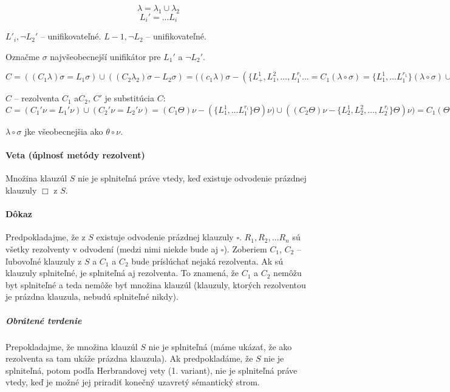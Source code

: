 $$ \lambda = \lambda_1 \cup \lambda_2$$
$$L_i' = \mbox{...} L_i$$

$L'_i, \neg L_2'$ -- unifikovateľné.
$L-1, \neg L_2$ -- unifikovateľné.

Označme $\sigma$ najvšeobecnejší unifikátor pre $L_1'$ a $\neg L_2'$.

$C= ((C_1\lambda)\sigma = L_1\sigma) \cup
((C_2\lambda_2)\sigma-L_2\sigma) = ((c_1\lambda)\sigma - (\{L^1_+, L^2_1,
\ldots, L^{r_i}_1 ...
= C_1(\lambda\circ \sigma) = \{ L^1_1, \ldots L^{r_1}_1 \} (\lambda\circ\sigma)
\cup C_2)(\lambda\circ\sigma) - \{L^1_2, \ldots
L^{r_i}_1\}(\lambda\circ\sigma)$

\par $C$ -- rezolventa $C_1$ a$C_2$, $C'$ je substitúcia $C$:
$C = (C_1' \nu = L_1' \nu) \cup (C_2'\nu = L_2'\nu) = (C_1\Theta)\nu -
(\{L^1_1, \ldots L^{r_i}_1\}\Theta)\nu)\cup ((C_2\Theta)\nu - \{L^1_2, L^2_2,
\ldots, L^{r_i}_2\}\Theta )\nu) = 
C_1(\Theta\circ\nu) - \{L^1_1, \ldots, L^{r_i}_1\} \Theta\circ\nu) \cup
(C_2(\Theta\circ\nu) - \{L^1_2, \ldots L^{r_i}_2\} \Theta\circ\nu)
$

$\lambda \circ \sigma$ jke všeobecnejšia ako $\theta \circ \nu$.


\paragraph{Veta (úplnosť metódy rezolvent)} Množina klauzúl $S$ nie je
splniteľná práve vtedy, keď existuje odvodenie prázdnej klauzuly $\Box$ z $S$.

\paragraph{Dôkaz} Predpokladajme, že z $S$ existuje odvodenie prázdnej klauzuly
$\square$. $R_1, R_2, \ldots R_n$ sú všetky rezolventy v odvodení (medzi nimi
niekde bude aj $\square$). Zoberiem $C_1$, $C_2$ -- ľubovoľné klauzuly z $S$ a
$C_1$ a $C_2$ bude príslúchať nejaká rezolventa. Ak sú klauzuly splniteľné, je
splniteľná aj rezolventa. To znamená, že $C_1$ a $C_2$ nemôžu byt splniteľné a
teda nemôže byť množina klauzúl (klauzuly, ktorých rezolventou je prázdna
klauzula, nebudú splniteľné nikdy). 

\subparagraph{Obrátené tvrdenie} Prepokladajme, že množina klauzúl $S$ nie je
splniteľná (máme ukázať, že ako rezolventa sa tam ukáže prázdna klauzula). Ak
predpokladáme, že $S$ nie je splniteľná, potom podľa Herbrandovej vety (1.
variant), nie je splniteľná práve vtedy, keď je možné jej priradiť konečný
uzavretý sémantický strom. 

